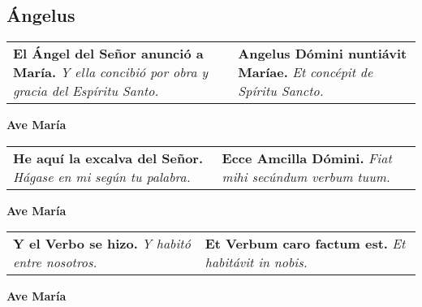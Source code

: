 \documentclass[./devocionario.tex]{subfiles}
\begin{document}
\subsection*{Ángelus}

\begin{tabular} { p{} p{} }
    \textbf{El Ángel del Señor anunció a María.}\newline
    \textit{Y ella concibió por obra y gracia del Espíritu Santo.}

    &

    \textbf{Angelus Dómini nuntiávit Maríae.}\newline
    \textit{Et concépit de Spíritu Sancto.}
\end{tabular}

\begin{center}
    \textbf{Ave María}
\end{center}

\begin{tabular} { p{} p{} }
    \textbf{He aquí la excalva del Señor.}\newline
    \textit{Hágase en mi según tu palabra.}

    &

    \textbf{Ecce Amcilla Dómini.}\newline
    \textit{Fiat mihi secúndum verbum tuum.}
\end{tabular}

\begin{center}
    \textbf{Ave María}
\end{center}

\begin{tabular} { p{} p{} }
    \textbf{Y el Verbo se hizo.}\newline
    \textit{Y habitó entre nosotros.}

    &

    \textbf{Et Verbum caro factum est.}\newline
    \textit{Et habitávit in nobis.}
\end{tabular}

\begin{center}
    \textbf{Ave María}
\end{center}
\end{document}
